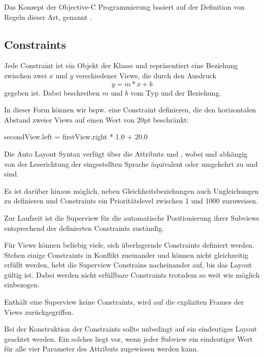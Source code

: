 \documentclass[parskip=half, final]{scrreprt}
\begin{document}
Das  Konzept der Objective-C Programmierung basiert auf der Definition von Regeln dieser Art, genannt .

\subsection{Constraints}

Jede Constraint ist ein Objekt der Klasse  und repräsentiert eine Beziehung zwischen zwei  $x$ und $y$ verschiedener Views, die durch den Ausdruck
\begin{equation}
y = m*x + b
\end{equation}
gegeben ist. Dabei beschreiben $m$ und $b$ vom Typ   und  der Beziehung.

In dieser Form können wir bspw. eine Constraint definieren, die den horizontalen Abstand zweier Views auf einen Wert von 20pt beschränkt:
\begin{objclst}
secondView.left = firstView.right * 1.0 + 20.0
\end{objclst}

Die Auto Layout Syntax verfügt über die Attribute  und , wobei  und  abhängig von der Leserichtung der eingestellten Sprache äquivalent oder umgekehrt zu  und  sind.

Es ist darüber hinaus möglich, neben Gleichheitsbeziehungen auch Ungleichungen zu definieren und Constraints ein Prioritätslevel zwischen 1 und 1000 zuzuweisen.

Zur Laufzeit ist die Superview für die automatische Positionierung ihrer Subviews entsprechend der definierten Constraints zuständig.

Für Views können beliebig viele, sich überlagernde Constraints definiert werden. Stehen einige Constraints in Konflikt zueinander und können nicht gleichzeitig erfüllt werden, hebt die Superview Constrains nacheinander auf, bis das Layout gültig ist. Dabei werden nicht erfüllbare Constraints trotzdem so weit wie möglich einbezogen.

Enthält eine Superview keine Constraints, wird auf die expliziten Frames der Views zurückgegriffen.

Bei der Konstruktion der Constraints sollte unbedingt auf ein eindeutiges Layout geachtet werden. Ein solches liegt vor, wenn jeder Subview ein eindeutiger Wert für alle vier Parameter des  Attributs zugewiesen werden kann.
\end{document}
